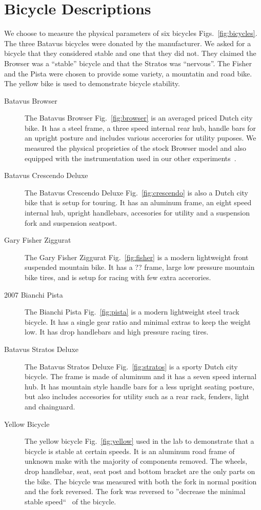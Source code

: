 \documentclass{bmd2010p}
\begin{document}
\section{Bicycle Descriptions}
We choose to measure the physical parameters of six bicycles
Figs.~\ref{fig:bicycles}. The three Batavus bicycles were donated by the
manufacturer. We asked for a bicycle that they considered stable and one that
they did not. They claimed the Browser was a ``stable'' bicycle and that the
Stratos was ``nervous''. The Fisher and the Pista were chosen to provide some
variety, a mountatin and road bike. The yellow bike is used to demonstrate
bicycle stability.
\begin{description}
    \item[Batavus Browser]{The Batavus Browser Fig.~\ref{fig:browser} is an averaged priced Dutch city
        bike. It has a steel frame, a three speed internal rear hub, handle
        bars for an upright posture and includes various accerories for utility
        puposes. We measured the physical proprieties of the stock Browser model and
        also equipped with the instrumentation used in our other
        experiments~\cite{Kooijman2009}.}
    \item[Batavus Crescendo Deluxe]{The Batavus Crescendo Deluxe
        Fig.~\ref{fig:crescendo} is also a
        Dutch city bike that is setup for touring. It has an aluminum frame, an
        eight speed internal hub, upright handlebars, accesories for utility
        and a suspension fork and suspension seatpost.}
    \item[Gary Fisher Ziggurat]{The Gary Fisher Ziggurat Fig.~\ref{fig:fisher} is a modern
        lightweight front suspended mountain bike. It has a ?? frame, large low
        pressure mountain bike tires, and is setup for racing with few extra accerories.}
    \item[2007 Bianchi Pista]{The Bianchi Pista Fig.~\ref{fig:pista} is a modern lightweight steel track
        bicycle. It has a single gear ratio and minimal extras to keep the
        weight low. It has drop handlebars and high pressure racing tires.}
    \item[Batavus Stratos Deluxe]{The Batavus Stratos Deluxe
        Fig.~\ref{fig:stratos} is a sporty Dutch city bicycle. The frame is
        made of aluminum and it has a seven speed internal hub. It has mountain
        style handle bars for a less upright seating posture, but also includes
        accesories for utility such as a rear rack, fenders, light and
        chainguard.}
    \item[Yellow Bicycle]{The yellow bicycle Fig.~\ref{fig:yellow} used in the lab to
        demonstrate that a bicycle is stable at certain speeds. It is an
        aluminum road frame of unknown make with the majority of components
        removed. The wheels, drop handlebar, seat, seat post and bottom bracket
        are the only parts on the bike. The bicycle was measured with both the
        fork in normal position and the fork reversed. The fork was reversed to
        ''decrease the minimal stable speed``~\cite{Kooijman2006} of the bicycle.}
\end{description}
\end{document}
